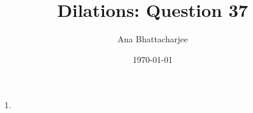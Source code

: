 \documentclass{article}
\begin{document}
\title{Dilations: Question 37}
\author{Ana Bhattacharjee}
\date{\today}

\begin{center}
\begin{enumerate}[label=(\alph*)]
  \item
\end{enumerate}
\end{center}
\end{document}
